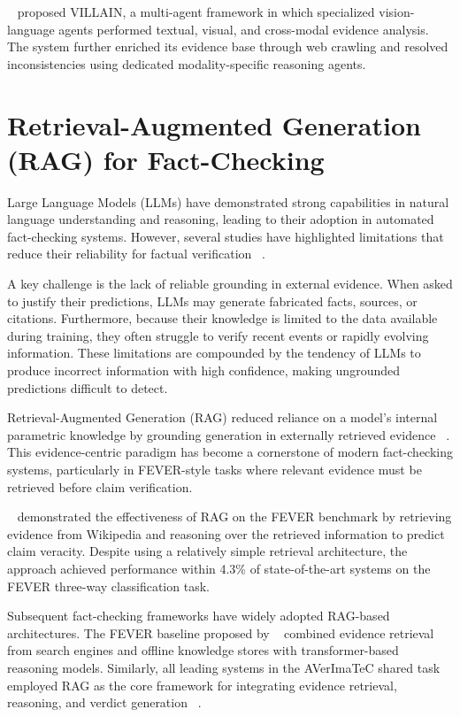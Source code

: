 ~\citet{Jung2026Mar} proposed VILLAIN, a multi-agent framework in which specialized vision-language agents performed textual, visual, and cross-modal evidence analysis. The system further enriched its evidence base through web crawling and resolved inconsistencies using dedicated modality-specific reasoning agents.

\section{Retrieval-Augmented Generation (RAG) for Fact-Checking}

Large Language Models (LLMs) have demonstrated strong capabilities in natural language understanding and reasoning, leading to their adoption in automated fact-checking systems. However, several studies have highlighted limitations that reduce their reliability for factual verification ~\cite{Proma2025Feb,Lewis2020May}.

A key challenge is the lack of reliable grounding in external evidence. When asked to justify their predictions, LLMs may generate fabricated facts, sources, or citations. Furthermore, because their knowledge is limited to the data available during training, they often struggle to verify recent events or rapidly evolving information. These limitations are compounded by the tendency of LLMs to produce incorrect information with high confidence, making ungrounded predictions difficult to detect.

Retrieval-Augmented Generation (RAG) reduced reliance on a model's internal parametric knowledge by grounding generation in externally retrieved evidence ~\cite{Lewis2020May}. This evidence-centric paradigm has become a cornerstone of modern fact-checking systems, particularly in FEVER-style tasks where relevant evidence must be retrieved before claim verification.

~\citet{Lewis2020May} demonstrated the effectiveness of RAG on the FEVER benchmark by retrieving evidence from Wikipedia and reasoning over the retrieved information to predict claim veracity. Despite using a relatively simple retrieval architecture, the approach achieved performance within 4.3\% of state-of-the-art systems on the FEVER three-way classification task.

Subsequent fact-checking frameworks have widely adopted RAG-based architectures. The FEVER baseline proposed by ~\citet{Schlichtkrull2023May} combined evidence retrieval from search engines and offline knowledge stores with transformer-based reasoning models. Similarly, all leading systems in the AVerImaTeC shared task employed RAG as the core framework for integrating evidence retrieval, reasoning, and verdict generation ~\cite{Cao2026Mar}.

